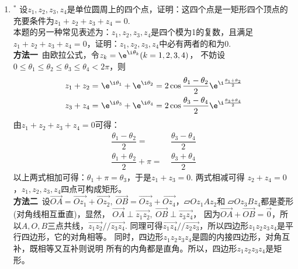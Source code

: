 \begin{enumerate}[label={【\textbf{例\thechapter.\arabic*}】},
 leftmargin=\inteval{\myenumleftmargin}pt,
 itemsep=\inteval{\myenumitempsep}pt,
 itemindent=\inteval{\myenumitemindent}pt]
\item $ ^* $ 
设$ z_1,z_2,z_3,z_4 $是单位圆周上的四个点，证明：这四个点是一矩形四个顶点的
充要条件为$ z_1+z_2+z_3+z_4=0 $. \\
本题的另一种常见表述为：$ z_1,z_2,z_3,z_4 $是四个模为1的复数，且满足
$ z_1+z_2+z_3+z_4=0 $，证明：$ z_1,z_2,z_3,z_4 $中必有两者的和为0.\\
\textbf{方法一}\ 由欧拉公式，令$ z_k=\e^{\i\theta_k} (k=1,2,3,4) $，
不妨设$ 0\leq \theta_1\leq \theta_2\leq \theta_3\leq \theta_4<2\pi $，则
\begin{align*}
    z_1+z_2=&\  \e^{\i\theta_1}+\e^{\i\theta_2}=
    2\cos\dfrac{\theta_1-\theta_2}{2}\e^{\i\frac{\theta_1+\theta_2}{2}} \\
    z_3+z_4=&\  \e^{\i\theta_3}+\e^{\i\theta_4}=2\cos\dfrac{\theta_3-
        \theta_4}{2} \e^{\i\frac{\theta_3+\theta_4}{2}}    
\end{align*}
由$ z_1+z_2+z_3+z_4=0 $可得：
\begin{align*}
    \dfrac{\theta_1-\theta_2}{2}=&\ \dfrac{\theta_3-\theta_4}{2} \\
    \dfrac{\theta_1+\theta_2}{2}+\pi=&\ \dfrac{\theta_3+\theta_4}{2}
\end{align*}
以上两式相加可得：$ \theta_1+\pi=\theta_3 $，于是$ z_1+z_3=0 $. 两式相减可得
$ z_2+z_4=0 $，$ z_1,z_2,z_3,z_4 $四点可构成矩形。\\
\textbf{方法二}\ 设$ \vec{OA}=\vec{Oz_1}+
\vec{Oz_2},\ \vec{OB}=\vec{Oz_3}+
\vec{Oz_4} $，$ \parallelogram Oz_1Az_2 $和
$ \parallelogram Oz_3Bz_4 $都是菱形(对角线相互垂直)，显然，
$ \vec{OA}\perp\vec{
    z_1z_2},\ \vec{OB}\perp\vec{z_3z_4} $，
因为$ \vec{OA}+\vec{OB}
=\vec{0} $，所以$ A,O,B $三点共线，$\vec{z_1z_2}
//\vec{z_3z_4} $. 同理可得$ \vec{z_1z_4}//
\vec{z_2z_3} $，所以四边形$ z_1z_2z_3z_4 $是平行四边形，它的对角相等。
同时，四边形$ z_1z_2z_3z_4 $是圆的内接四边形，对角互补，既相等又互补则说明
所有的内角都是直角。所以，四边形$ z_1z_2z_3z_4 $是矩形。


\end{enumerate}
